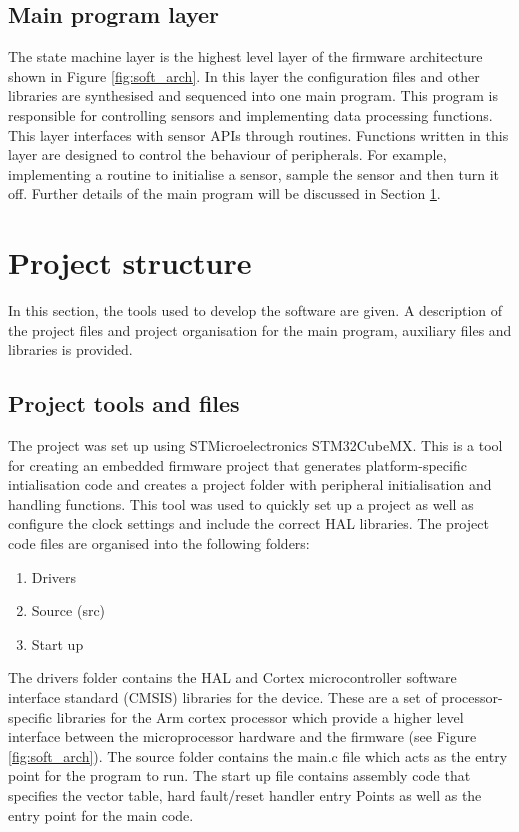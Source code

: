\subsection{Main program layer}
\label{subsec:ch5_SML}
The state machine layer is the highest level layer of the firmware architecture shown in Figure \ref{fig:soft_arch}. In this layer the configuration files and other libraries are synthesised and sequenced into one main program. This program is responsible for controlling sensors and implementing data processing functions. This layer interfaces with sensor APIs through routines. Functions written in this layer are designed to control the behaviour of peripherals. For example, implementing a routine to initialise a sensor, sample the sensor and then turn it off. Further details of the main program will be discussed in Section \ref{sec:ch5_projstruct}.

\section{Project structure}
\label{sec:ch5_projstruct}

In this section, the tools used to develop the software are given. A description of the project files and project organisation for the main program, auxiliary files and libraries is provided.

\subsection{Project tools and files} 

The project was set up using STMicroelectronics STM32CubeMX. This is a tool for creating an embedded firmware project that generates platform-specific intialisation code and creates a project folder with peripheral initialisation and handling functions. This tool was used to quickly set up a project as well as configure the clock settings and include the correct HAL libraries. The project code files are organised into the following folders:


\begin{enumerate}
	\item Drivers
	\item Source (src)
	\item Start up 
\end{enumerate}


The drivers folder contains the HAL and Cortex microcontroller software interface standard (CMSIS) libraries for the device. These are a set of processor-specific libraries for the Arm cortex processor which provide a higher level interface between the microprocessor hardware and the firmware (see Figure \ref{fig:soft_arch}). The source folder contains the main.c file which acts as the entry point for the program to run. The start up file contains assembly code that specifies the vector table, hard fault/reset handler entry Points as well as the entry point for the main code. 

